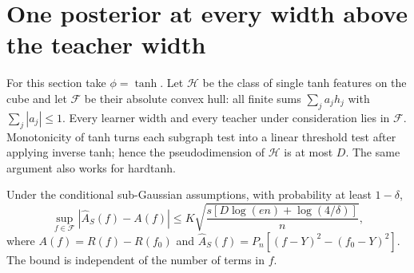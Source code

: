 \section{One posterior at every width above the teacher width}
\label{sec:l1-all-width}
For this section take $\phi=\tanh$. Let $\mathcal H$ be the class of
single tanh features on the cube and let $\mathcal F$ be their absolute
convex hull: all finite sums $\sum_j a_jh_j$ with $\sum_j|a_j|\le1$.
Every learner width and every teacher under consideration lies in
$\mathcal F$. Monotonicity of tanh turns each subgraph test into a
linear threshold test after applying inverse tanh; hence the
pseudodimension of $\mathcal H$ is at most $D$. The same argument
also works for hardtanh.

\begin{lemma}
\label{lem:variation-uniform}
Under the conditional sub-Gaussian assumptions, with probability at
least $1-\delta$,
\[
 \sup_{f\in\mathcal F}|\widehat A_S(f)-A(f)|
 \le K\sqrt{\frac{s[D\log(en)+\log(4/\delta)]}{n}},
\]
where $A(f)=R(f)-R(f_0)$ and
$\widehat A_S(f)=P_n[(f-Y)^2-(f_0-Y)^2]$.
The bound is independent of the number of terms in $f$.
\end{lemma}
